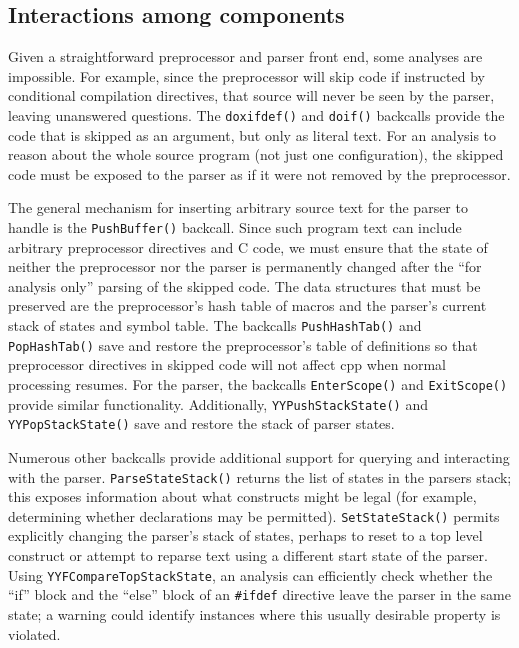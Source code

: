 \documentclass{article}
\newcommand{\Cpp}{\mbox{\textsf{cpp}}}
\newcommand{\C}{\mbox{\textsf{C}}}
\newcommand{\ppd}[1]{\texttt{\##1}}
\begin{document}

\subsection{Interactions among components}

Given a straightforward preprocessor and parser front end, some analyses
are impossible.  For example, since the preprocessor will skip code if
instructed by conditional compilation directives, that source will never
be seen by the parser, leaving unanswered questions.  The
\texttt{doxifdef()} and \texttt{doif()} backcalls provide the code that is
skipped as an argument, but only as literal text.  For an analysis to
reason about the whole source program (not just one configuration), the
skipped code must be exposed to the parser as if it were not removed by
the preprocessor.

The general mechanism for inserting arbitrary source text for the parser
to handle is the \texttt{PushBuffer()} backcall.  Since such program text
can include arbitrary preprocessor directives and \C{} code, we must
ensure that the state of neither the preprocessor nor the parser is
permanently changed after the ``for analysis only'' parsing of the
skipped code.  The data structures that must be preserved are the
preprocessor's hash table of macros and the parser's current stack of
states and symbol table.  The backcalls \texttt{PushHashTab()} and
\texttt{PopHashTab()} save and restore the preprocessor's table of
definitions so that preprocessor directives in skipped code will not
affect \Cpp{} when normal processing resumes.  For the parser, the
backcalls \texttt{EnterScope()} and \texttt{ExitScope()} provide similar
functionality.  Additionally, \texttt{YYPushStackState()} and
\texttt{YYPopStackState()} save and restore the stack of parser states.

Numerous other backcalls provide additional support for querying and
interacting with the parser.  \texttt{ParseStateStack()} returns the
list of states in the parsers stack; this exposes information about
what constructs might be legal (for example, determining whether
declarations may be permitted).  \texttt{SetStateStack()} permits
explicitly changing the parser's stack of states, perhaps to reset to a
top level construct or attempt to reparse text using a different start
state of the parser.  Using \texttt{YYFCompareTopStackState}, an
analysis can efficiently check whether the ``if'' block and the ``else''
block of an \ppd{ifdef} directive leave the parser in the same state;
a warning could identify instances where this usually desirable
property is violated.
\end{document}
